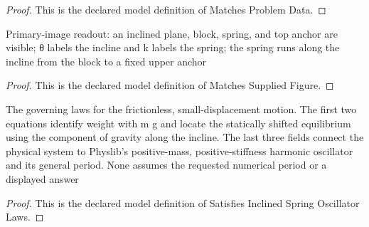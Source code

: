 \begin{proof}
  This is the declared model definition of Matches Problem Data.
\end{proof}
\begin{definition}
  \label{def:physics:phyx-mini-0257:phyxminiproblems-problemphyxmini0257-matchessuppliedfigure}
  Primary-image readout: an inclined plane, block, spring, and top anchor are visible; θ labels the incline and k labels the spring; the spring runs along the incline from the block to a fixed upper anchor
\end{definition}
\begin{proof}
  This is the declared model definition of Matches Supplied Figure.
\end{proof}
\begin{definition}
  \label{def:physics:phyx-mini-0257:phyxminiproblems-problemphyxmini0257-satisfiesinclinedspringoscillatorlaws}
  The governing laws for the frictionless, small-displacement motion. The first two equations identify weight with m g and locate the statically shifted equilibrium using the component of gravity along the incline. The last three fields connect the physical system to Physlib's positive-mass, positive-stiffness harmonic oscillator and its general period. None assumes the requested numerical period or a displayed answer
\end{definition}
\begin{proof}
  This is the declared model definition of Satisfies Inclined Spring Oscillator Laws.
\end{proof}
